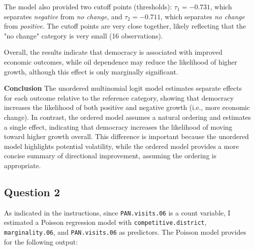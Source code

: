 \documentclass[12pt,letterpaper]{article}
\begin{document}
The model also provided two cutoff points (thresholds): $\tau_1 = -0.731$, which separates \textit{negative} from \textit{no change}, and $\tau_2 = -0.711$, which separates \textit{no change} from \textit{positive}. The cutoff points are very close together, likely reflecting that the "no change" category is very small (16 observations).

Overall, the results indicate that democracy is associated with improved economic outcomes, while oil dependence may reduce the likelihood of higher growth, although this effect is only marginally significant.

\textbf{Conclusion} The unordered multinomial logit model estimates separate effects for each outcome relative to the reference category, showing that democracy increases the likelihood of both positive and negative growth (i.e., more economic change). In contrast, the ordered model assumes a natural ordering and estimates a single effect, indicating that democracy increases the likelihood of moving toward higher growth overall. This difference is important because the unordered model highlights potential volatility, while the ordered model provides a more concise summary of directional improvement, assuming the ordering is appropriate.



\subsection*{Question 2}

As indicated in the instructions, since \texttt{PAN.visits.06} is a count variable, I estimated a Poisson regression model with \texttt{competitive.district}, \texttt{marginality.06}, and \texttt{PAN.visits.06} as predictors. The Poisson model provides for the following output: 
\end{document}
